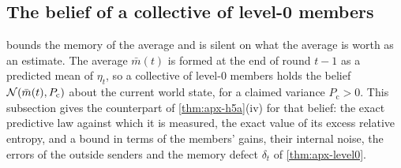 \subsection{The belief of a collective of level-0 members}\label{sec:apx-level0-belief}

 bounds the memory of the average and is silent on what the average is worth as an estimate. The average $\bar m(t)$ is formed at the end of round $t-1$ as a predicted mean of $\eta_t$, so a collective of level-0 members holds the belief $\mathcal{N}(\bar m(t),P_{\mathrm c})$ about the current world state, for a claimed variance $P_{\mathrm c}>0$. This subsection gives the counterpart of \cref{thm:apx-h5a}(iv) for that belief: the exact predictive law against which it is measured, the exact value of its excess relative entropy, and a bound in terms of the members' gains, their internal noise, the errors of the outside senders and the memory defect $\delta_t$ of \cref{thm:apx-level0}.

